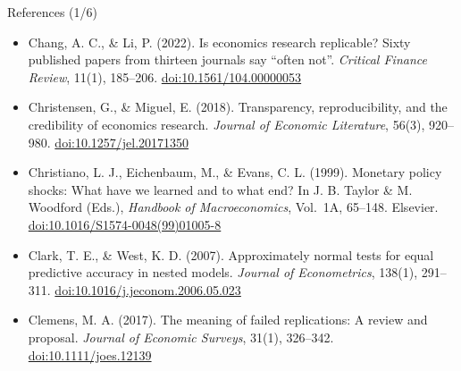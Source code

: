 \begin{frame}{References (1/6)}
\begin{itemize}
    \item Chang, A. C., \& Li, P. (2022). Is economics research replicable? Sixty published papers from thirteen journals say ``often not''. \textit{Critical Finance Review}, 11(1), 185--206. \href{https://doi.org/10.1561/104.00000053}{doi:10.1561/104.00000053}
    \item Christensen, G., \& Miguel, E. (2018). Transparency, reproducibility, and the credibility of economics research. \textit{Journal of Economic Literature}, 56(3), 920--980. \href{https://doi.org/10.1257/jel.20171350}{doi:10.1257/jel.20171350}
    \item Christiano, L. J., Eichenbaum, M., \& Evans, C. L. (1999). Monetary policy shocks: What have we learned and to what end? In J. B. Taylor \& M. Woodford (Eds.), \textit{Handbook of Macroeconomics}, Vol.\ 1A, 65--148. Elsevier. \href{https://doi.org/10.1016/S1574-0048(99)01005-8}{doi:10.1016/S1574-0048(99)01005-8}
    \item Clark, T. E., \& West, K. D. (2007). Approximately normal tests for equal predictive accuracy in nested models. \textit{Journal of Econometrics}, 138(1), 291--311. \href{https://doi.org/10.1016/j.jeconom.2006.05.023}{doi:10.1016/j.jeconom.2006.05.023}
    \item Clemens, M. A. (2017). The meaning of failed replications: A review and proposal. \textit{Journal of Economic Surveys}, 31(1), 326--342. \href{https://doi.org/10.1111/joes.12139}{doi:10.1111/joes.12139}
\end{itemize}
\end{frame}

